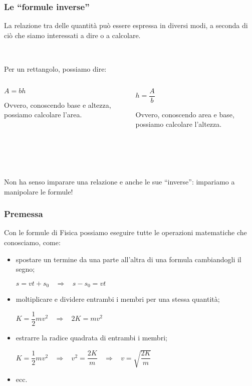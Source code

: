 \documentclass[]{beamer}
\begin{document}
\begin{frame}
\frametitle{Le ``formule inverse''}
La relazione tra delle quantità può essere espressa in diversi modi, a seconda di ciò che siamo interessati a dire o a calcolare.\pause

~

Per un rettangolo, possiamo dire:
\begin{columns}
\begin{column}{0.45\textwidth}
\begin{center}
$ A = bh $
\end{center}
Ovvero, conoscendo base e altezza, possiamo calcolare l'area.\pause
\end{column}
\begin{column}{0.45\textwidth}
\begin{center}
$ h = \dfrac{A}{b} $
\end{center}
Ovvero, conoscendo area e base, possiamo calcolare l'altezza.\pause
\end{column}
\end{columns}

~

~

Non ha senso imparare una relazione e anche le sue ``inverse'': impariamo a \alert{manipolare le formule}!
\end{frame}


\begin{frame}
\frametitle{Premessa}
Con le formule di Fisica possiamo eseguire tutte le operazioni matematiche che conosciamo, come:
\begin{itemize}
  \item spostare un termine da una parte all'altra di una formula cambiandogli il segno;
  \begin{center}
  $ s = vt + s_0 ~~~~ \Longrightarrow ~~~~ s - s_0 = vt $
  \end{center}\pause
  \item moltiplicare e dividere entrambi i membri per una stessa quantità;
  \begin{center}
  $ K = \dfrac{1}{2}mv^2 ~~~~ \Longrightarrow ~~~~2K = mv^2 $
  \end{center}\pause
  \item estrarre la radice quadrata di entrambi i membri;
  \begin{center}
  $ K = \dfrac{1}{2}mv^2 ~~~~ \Longrightarrow ~~~~ v^2 = \dfrac{2K}{m} ~~~~ \Longrightarrow ~~~~ v = \sqrt{\dfrac{2K}{m}} $
  \end{center}
  \item ecc.
\end{itemize}
\end{frame}
\end{document}
